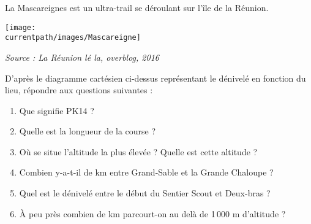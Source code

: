 
\begin{exercice*}
   La Mascareignes est un ultra-trail se déroulant sur l'île de la Réunion.
   \begin{center}
      \texttt{[image: \\currentpath/images/Mascareigne]}
      
      \hfill {\footnotesize\it Source : La Réunion lé la, overblog, 2016}
   \end{center}
   D'après le diagramme cartésien ci-dessus représentant le dénivelé en fonction du lieu, répondre aux questions suivantes :
   \begin{enumerate}
      \item Que signifie \og PK14 \fg ?
      \item Quelle est la longueur de la course ?
      \item Où se situe l'altitude la plus élevée ? Quelle est cette altitude ?
      \item Combien y-a-t-il de km entre Grand-Sable et la Grande Chaloupe ?
      \item Quel est le dénivelé entre le début du Sentier Scout et Deux-bras ?
      \item À peu près combien de km parcourt-on au delà de 1\,000 m d'altitude ?
   \end{enumerate}
\end{exercice*}
